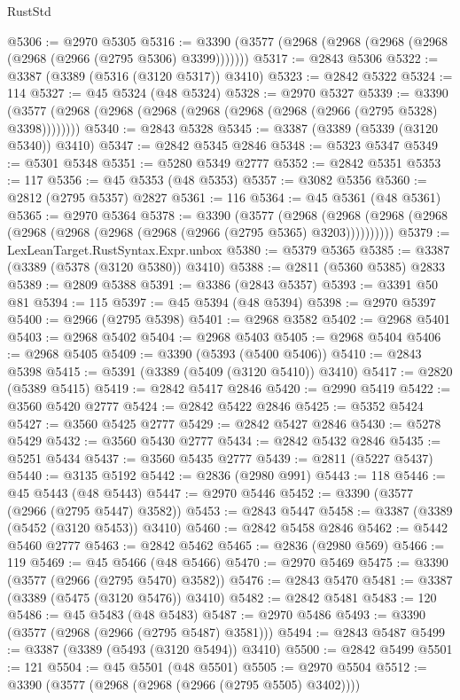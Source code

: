 \begin{lexlean}{RustStd}
\begin{coremodule}
{\begin{coremodule}
{{{{{{{{{{{{{{{{{{{{{{{{{{{{{{{{{@5306 := @2970 @5305
@5316 := @3390 (@3577 (@2968 (@2968 (@2968 (@2968 (@2968 (@2966 (@2795 @5306) @3399)))))))
@5317 := @2843 @5306
@5322 := @3387 (@3389 (@5316 (@3120 @5317)) @3410)
@5323 := @2842 @5322
@5324 := 114
@5327 := @45 @5324 (@48 @5324)
@5328 := @2970 @5327
@5339 := @3390 (@3577 (@2968 (@2968 (@2968 (@2968 (@2968 (@2968 (@2966 (@2795 @5328) @3398))))))))
@5340 := @2843 @5328
@5345 := @3387 (@3389 (@5339 (@3120 @5340)) @3410)
@5347 := @2842 @5345 @2846
@5348 := @5323 @5347
@5349 := @5301 @5348
@5351 := @5280 @5349 @2777
@5352 := @2842 @5351
@5353 := 117
@5356 := @45 @5353 (@48 @5353)
@5357 := @3082 @5356
@5360 := @2812 (@2795 @5357) @2827
@5361 := 116
@5364 := @45 @5361 (@48 @5361)
@5365 := @2970 @5364
@5378 := @3390
    (@3577
      (@2968 (@2968 (@2968 (@2968 (@2968 (@2968 (@2968 (@2968 (@2966 (@2795 @5365) @3203))))))))))
@5379 := LexLeanTarget.RustSyntax.Expr.unbox
@5380 := @5379 @5365
@5385 := @3387 (@3389 (@5378 (@3120 @5380)) @3410)
@5388 := @2811 (@5360 @5385) @2833
@5389 := @2809 @5388
@5391 := @3386 (@2843 @5357)
@5393 := @3391 @50 @81
@5394 := 115
@5397 := @45 @5394 (@48 @5394)
@5398 := @2970 @5397
@5400 := @2966 (@2795 @5398)
@5401 := @2968 @3582
@5402 := @2968 @5401
@5403 := @2968 @5402
@5404 := @2968 @5403
@5405 := @2968 @5404
@5406 := @2968 @5405
@5409 := @3390 (@5393 (@5400 @5406))
@5410 := @2843 @5398
@5415 := @5391 (@3389 (@5409 (@3120 @5410)) @3410)
@5417 := @2820 (@5389 @5415)
@5419 := @2842 @5417 @2846
@5420 := @2990 @5419
@5422 := @3560 @5420 @2777
@5424 := @2842 @5422 @2846
@5425 := @5352 @5424
@5427 := @3560 @5425 @2777
@5429 := @2842 @5427 @2846
@5430 := @5278 @5429
@5432 := @3560 @5430 @2777
@5434 := @2842 @5432 @2846
@5435 := @5251 @5434
@5437 := @3560 @5435 @2777
@5439 := @2811 (@5227 @5437)
@5440 := @3135 @5192
@5442 := @2836 (@2980 @991)
@5443 := 118
@5446 := @45 @5443 (@48 @5443)
@5447 := @2970 @5446
@5452 := @3390 (@3577 (@2966 (@2795 @5447) @3582))
@5453 := @2843 @5447
@5458 := @3387 (@3389 (@5452 (@3120 @5453)) @3410)
@5460 := @2842 @5458 @2846
@5462 := @5442 @5460 @2777
@5463 := @2842 @5462
@5465 := @2836 (@2980 @569)
@5466 := 119
@5469 := @45 @5466 (@48 @5466)
@5470 := @2970 @5469
@5475 := @3390 (@3577 (@2966 (@2795 @5470) @3582))
@5476 := @2843 @5470
@5481 := @3387 (@3389 (@5475 (@3120 @5476)) @3410)
@5482 := @2842 @5481
@5483 := 120
@5486 := @45 @5483 (@48 @5483)
@5487 := @2970 @5486
@5493 := @3390 (@3577 (@2968 (@2966 (@2795 @5487) @3581)))
@5494 := @2843 @5487
@5499 := @3387 (@3389 (@5493 (@3120 @5494)) @3410)
@5500 := @2842 @5499
@5501 := 121
@5504 := @45 @5501 (@48 @5501)
@5505 := @2970 @5504
@5512 := @3390 (@3577 (@2968 (@2968 (@2966 (@2795 @5505) @3402))))
}}}}}}}}}}}}}}}}}}}}}}}}}}}}}}}}}
\end{coremodule}}
\end{coremodule}
\end{lexlean}
